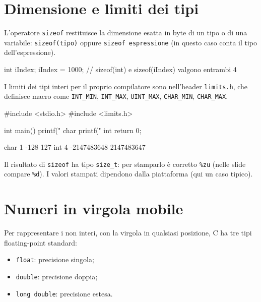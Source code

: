 \documentclass[11pt,a4paper]{article}
\begin{document}
\section{Dimensione e limiti dei tipi}

L'operatore \lstinline|sizeof| restituisce la dimensione esatta in byte di un tipo
o di una variabile: \lstinline|sizeof(tipo)| oppure \lstinline|sizeof espressione|
(in questo caso conta il tipo dell'espressione).

\begin{codice}
int iIndex;
iIndex = 1000;
// sizeof(int) e sizeof(iIndex) valgono entrambi 4
\end{codice}

I limiti dei tipi interi per il proprio compilatore sono nell'header
\lstinline|limits.h|, che definisce macro come \lstinline|INT_MIN|,
\lstinline|INT_MAX|, \lstinline|UINT_MAX|, \lstinline|CHAR_MIN|,
\lstinline|CHAR_MAX|.

\begin{codice}
#include <stdio.h>
#include <limits.h>

int main() {
    printf(" char %
    printf(" int %
    return 0;
}
\end{codice}
\begin{risultato}
 char 1 -128 127
 int 4 -2147483648 2147483647
\end{risultato}

\begin{osservazione}
Il risultato di \lstinline|sizeof| ha tipo \lstinline|size_t|: per stamparlo è
corretto \lstinline|%zu| (nelle slide compare \lstinline|%d|). I valori stampati
dipendono dalla piattaforma (qui un caso tipico).
\end{osservazione}

\section{Numeri in virgola mobile}

Per rappresentare i non interi, con la virgola in qualsiasi posizione, C ha tre
tipi floating-point standard:
\begin{itemize}
    \item \lstinline|float|: precisione singola;
    \item \lstinline|double|: precisione doppia;
    \item \lstinline|long double|: precisione estesa.
\end{itemize}
\end{document}
